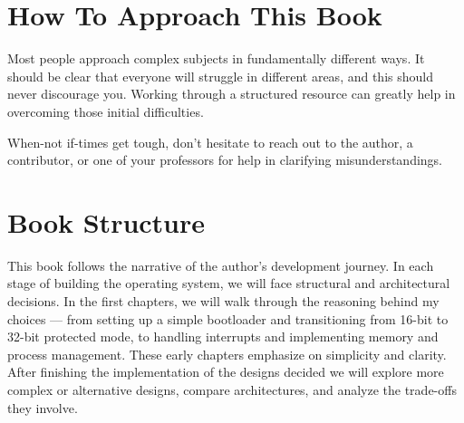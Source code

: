 \section{How To Approach This Book}

Most people approach complex subjects in fundamentally different ways. It should be clear that everyone 
will struggle in different areas, and this should never discourage you. Working through a structured 
resource can greatly help in overcoming those initial difficulties.

When-not if-times get tough, don't hesitate to reach out to the author, a contributor, or one of your professors 
for help in clarifying misunderstandings.

\section{Book Structure}

This book follows the narrative of the author's development journey. In each stage of building the operating 
system, we will face structural and architectural decisions. In the first chapters, we will walk through 
the reasoning behind my choices — from setting up a simple bootloader and transitioning from 16-bit to 
32-bit protected mode, to handling interrupts and implementing memory and process management. These early 
chapters emphasize on simplicity and clarity. After finishing the implementation of the designs decided we 
will explore more complex or alternative designs, compare architectures, and analyze the trade-offs they involve.
